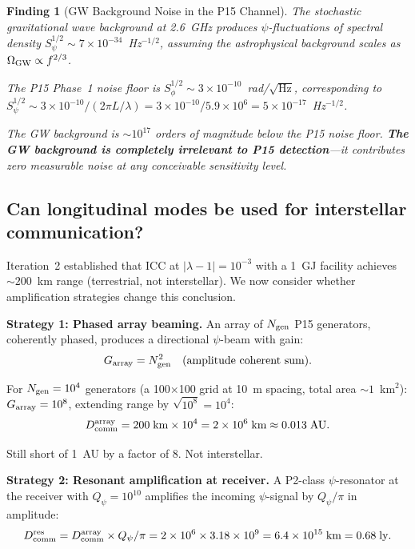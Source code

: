 \documentclass[11pt]{article}
\newtheorem{finding}{Finding}
\newcommand{\ee}[1]{\times 10^{#1}}
\newcommand{\lam}{\lambda}
\begin{document}
\begin{finding}[GW Background Noise in the P15 Channel]
\label{find:gw-noise}
The stochastic gravitational wave background at 2.6~GHz produces
$\psi$-fluctuations of spectral density
$S_\psi^{1/2} \sim 7\ee{-34}$~Hz$^{-1/2}$, assuming the
astrophysical background scales as $\Omega_{\rm GW} \propto f^{2/3}$.

The P15 Phase~1 noise floor is
$S_\phi^{1/2} \sim 3\ee{-10}$~rad/$\sqrt{\text{Hz}}$,
corresponding to $S_\psi^{1/2} \sim 3\ee{-10}/(2\pi L/\lambda)
= 3\ee{-10}/5.9\ee{6} = 5\ee{-17}$~Hz$^{-1/2}$.

The GW background is $\sim 10^{17}$ orders of magnitude below
the P15 noise floor. \textbf{The GW background is completely
irrelevant to P15 detection}---it contributes zero measurable noise
at any conceivable sensitivity level.
\end{finding}

\subsection{Can longitudinal modes be used for interstellar communication?}

Iteration~2 established that ICC at $|\lam-1| = 10^{-3}$ with a
1~GJ facility achieves $\sim 200$~km range (terrestrial, not
interstellar). We now consider whether amplification strategies
change this conclusion.

\textbf{Strategy 1: Phased array beaming.}
An array of $N_{\rm gen}$ P15 generators, coherently phased,
produces a directional $\psi$-beam with gain:
\begin{equation}
G_{\rm array} = N_{\rm gen}^2 \quad \text{(amplitude coherent sum)}.
\end{equation}

For $N_{\rm gen} = 10^4$ generators (a 100$\times$100 grid at
10~m spacing, total area $\sim 1$~km$^2$):
$G_{\rm array} = 10^8$, extending range by $\sqrt{10^8} = 10^4$:
\begin{equation}
D_{\rm comm}^{\rm array} = 200\;\text{km} \times 10^4
= 2\ee{6}\;\text{km} \approx 0.013\;\text{AU}.
\end{equation}

Still short of 1~AU by a factor of 8. Not interstellar.

\textbf{Strategy 2: Resonant amplification at receiver.}
A P2-class $\psi$-resonator at the receiver with $Q_\psi = 10^{10}$
amplifies the incoming $\psi$-signal by $Q_\psi/\pi$ in amplitude:
\begin{equation}
D_{\rm comm}^{\rm res} = D_{\rm comm}^{\rm array}
\times Q_\psi/\pi = 2\ee{6} \times 3.18\ee{9} = 6.4\ee{15}\;\text{km}
= 0.68\;\text{ly}.
\end{equation}
\end{document}
